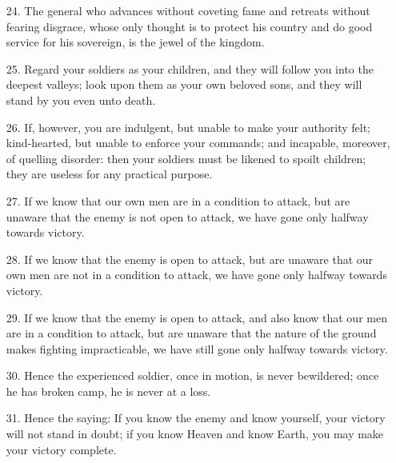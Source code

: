 \documentclass[11pt,openany]{memoir}
\newcommand{\enumeratemargin}{1.30em}
\begin{document}
\begin{enumerate}[leftmargin=\enumeratemargin]
\item[24.] The general who advances without coveting fame and retreats without fearing disgrace, whose only thought is to protect his country and do good service for his sovereign, is the jewel of the kingdom.
\item[25.] Regard your soldiers as your children, and they will follow you into the deepest valleys; look upon them as your own beloved sons, and they will stand by you even unto death.
\item[26.] If, however, you are indulgent, but unable to make your authority felt; kind-hearted, but unable to enforce your commands; and incapable, moreover, of quelling disorder: then your soldiers must be likened to spoilt children; they are useless for any practical purpose.
\item[27.] If we know that our own men are in a condition to attack, but are unaware that the enemy is not open to attack, we have gone only halfway towards victory.
\item[28.] If we know that the enemy is open to attack, but are unaware that our own men are not in a condition to attack, we have gone only halfway towards victory.
\item[29.] If we know that the enemy is open to attack, and also know that our men are in a condition to attack, but are unaware that the nature of the ground makes fighting impracticable, we have still gone only halfway towards victory.
\item[30.] Hence the experienced soldier, once in motion, is never bewildered; once he has broken camp, he is never at a loss.
\item[31.] Hence the saying: If you know the enemy and know yourself, your victory will not stand in doubt; if you know Heaven and know Earth, you may make your victory complete.
\end{enumerate}
\end{document}
